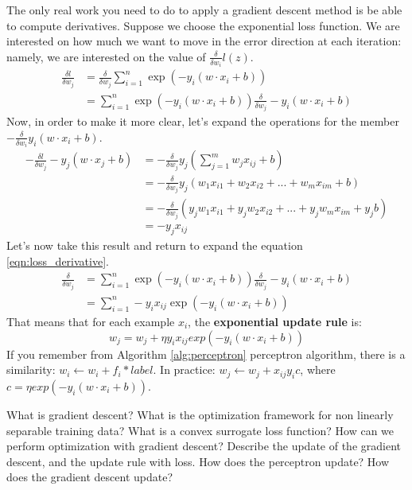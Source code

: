 The only real work you need to do to apply a gradient descent method is be able to compute derivatives. Suppose we choose the exponential loss function. We are interested on how much we want to move in the error direction at each iteration: namely, we are interested on the value of \(\frac \delta {\delta w_i} l(z)\).
\begin{align}
    \label{eqn:loss_derivative}
    \frac {\delta l} {\delta w_j} &= \frac \delta {\delta w_j} \sum_{i=1}^n \exp (-y_i (w \cdot x_i + b)) \\
    &= \sum_{i=1}^n \exp (-y_i (w \cdot x_i + b)) \frac \delta {\delta w_j} -y_i (w \cdot x_i + b)
\end{align}
Now, in order to make it more clear, let's expand the operations for the member \(- \frac \delta {\delta w_i} y_i(w \cdot x_i + b)\).
\begin{align*}
    - \frac {\delta l} {\delta w_j} -y_j (w \cdot x_j + b) &= - \frac \delta {\delta w_j} y_j (\sum_{j=1}^m w_j x_{ij} + b)\\
    &= -\frac \delta {\delta w_j} y_j (w_1 x_{i1} + w_2 x_{i2} + ... + w_m x_{im} + b) \\
    &= -\frac \delta {\delta w_j} (y_j w_1 x_{i1} + y_j w_2 x_{i2} + ... + y_j w_m x_{im} + y_j b) \\
    &= -y_j x_{ij}
\end{align*}
Let's now take this result and return to expand the equation \ref{eqn:loss_derivative}.
\begin{align}
    \frac \delta {\delta w_j} &= \sum_{i=1}^n \exp (-y_i (w \cdot x_i + b)) \frac \delta {\delta w_j} -y_i (w \cdot x_i + b) \\
    &= \sum_{i=1}^n -y_i x_{ij} \exp (-y_i (w \cdot x_i + b))
\end{align}
That means that for each example \(x_i\), the \textbf{exponential update rule} is:
\begin{equation}
    w_j = w_j + \eta y_i x_{ij} exp(-y_i (w \cdot x_i + b))
\end{equation}
If you remember from Algorithm \ref{alg:perceptron} perceptron algorithm, there is a similarity: \(w_i \gets w_i + f_i*label\). In practice: \(w_j \gets w_j + x_{ij} y_i c\), where \(c = \eta exp(-y_i (w \cdot x_i + b))\).

\newpage
\begin{exercise}[topsep=20pt,itemsep=10pt]
    \ex[!] What is gradient descent?
    \ex What is the optimization framework for non linearly separable training data?
    \ex What is a convex surrogate loss function?
    \ex How can we perform optimization with gradient descent?
    \ex[!] Describe the update of the gradient descent, and the update rule with loss.
    \ex[!] How does the perceptron update? How does the gradient descent update?
\end{exercise}